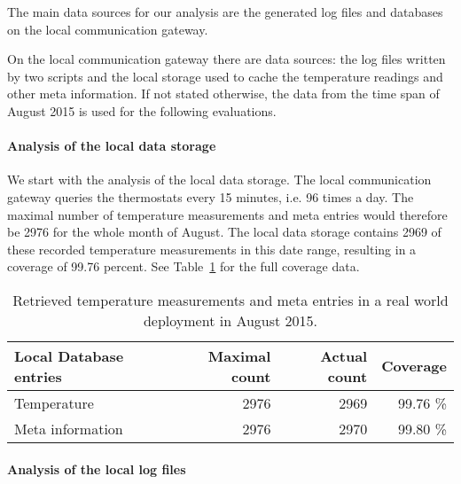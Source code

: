 The main data sources for our analysis are the generated log files and databases on the local communication gateway.

On the local communication gateway there are data sources: the log files written by two scripts and the local storage used to cache the temperature readings and other meta information.
If not stated otherwise, the data from the time span of August 2015 is used for the following evaluations.

\paragraph{Analysis of the local data storage}


We start with the analysis of the local data storage.
The local communication gateway queries the thermostats every 15 minutes, i.e. 96 times a day.
The maximal number of temperature measurements and meta entries would therefore be 2976 for the whole month of August.
The local data storage contains 2969 of these recorded temperature measurements in this date range, resulting in a coverage of 99.76 percent.
See Table~\ref{table:evaluation_local_database_coverage} for the full coverage data.

\begin{table}
	\begin{center}
		\begin{tabular}{ l | r r r }
			Local Database entries & Maximal count & Actual count & Coverage \\
			\hline
			Temperature					& 2976 & 2969 & 99.76 \% \\
			Meta information			& 2976 & 2970 & 99.80 \% \\
		\end{tabular}
		\caption{Retrieved temperature measurements and meta entries in a real world deployment in August 2015.}
		\label{table:evaluation_local_database_coverage}
	\end{center}
\end{table}

\paragraph{Analysis of the local log files}

